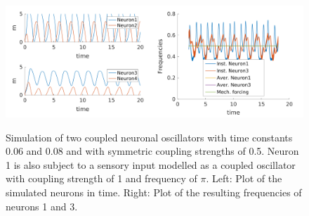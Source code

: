 \documentclass[a4paper]{scrartcl}
\begin{document}
\begin{figure}[!b]
	\centering
	\includegraphics[width=0.5\textwidth]{fig/figure7b_lowfreq-simu.png}\includegraphics[width=0.5\textwidth]{fig/figure7b_lowfreq-freq.png}
	\caption{Simulation of two coupled neuronal oscillators with time constants 0.06 and 0.08 and with symmetric coupling strengths of 0.5. Neuron 1 is also subject to a sensory input modelled as a coupled oscillator with coupling strength of 1 and frequency of $\pi$. Left: Plot of the simulated neurons in time. Right: Plot of the resulting frequencies of neurons 1 and 3.}
	\label{fig:7b-lowfreq}
\end{figure}
\end{document}
